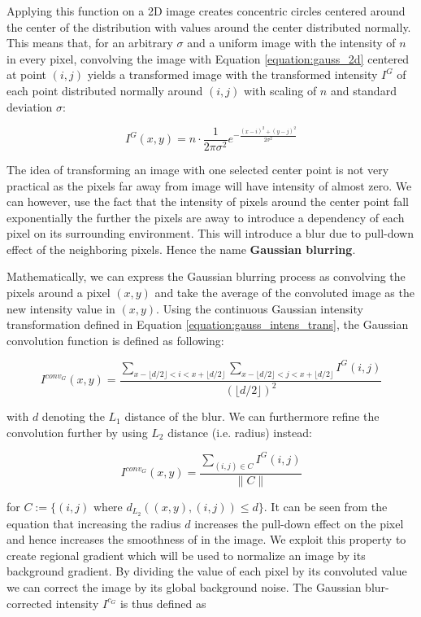 \documentclass[pdftex,12pt,a4paper]{report}
\begin{document}
Applying this function on a 2D image creates concentric circles centered around the center of the distribution with values around the center distributed normally. This means that, for an arbitrary $\sigma$  and a uniform image with the intensity of $n$ in every pixel,  convolving the image with Equation \ref{equation:gauss_2d} centered at point $(i, j)$ yields a transformed image with the transformed intensity $I^G$ of each point distributed normally around $(i, j)$ with scaling of $n$ and standard deviation $\sigma$:

\begin{equation}
I^G(x, y) = n \cdot \frac{1}{{2\pi \sigma^2}} e^{-\frac{(x - i)^2 + (y - j)^2}{2 \sigma^2}}
\label{equation:gauss_intens_trans}
\end{equation}

The idea of transforming an image with one selected center point is not very practical as the pixels far away from image will have intensity of almost zero. We can however, use the fact that the intensity of pixels around the center point fall exponentially the further the pixels are away to introduce a dependency of each pixel on its surrounding environment. This will introduce a blur due to pull-down effect of the neighboring pixels. Hence the name \textbf{Gaussian blurring}.

Mathematically, we can express the Gaussian blurring process as convolving the pixels around a pixel $(x, y)$ and take the average of the convoluted image as the new intensity value in $(x, y)$. Using the continuous Gaussian intensity transformation defined in Equation \ref{equation:gauss_intens_trans}, the Gaussian convolution  function is defined as following:

$$
I^{conv_G}(x, y) = \frac{\sum_{x - \lfloor d/2 \rfloor < i < x + \lfloor d/2 \rfloor} \sum_{x - \lfloor d/2 \rfloor < j < x + \lfloor d/2 \rfloor} I^G(i, j)}{(\lfloor d/2 \rfloor)^2}
$$

with $d$ denoting the $L_1$ distance of the blur.  We can furthermore refine the convolution further by using $L_2$ distance (i.e. radius) instead:

\begin{equation}
I^{conv_G}(x, y) = \frac{\sum_{(i, j) \in C}  I^G(i, j)}{\| C \|}
\label{equation:conv_gaussian_cont}
\end{equation}

for $C := \{(i, j)  \text{  where } d_{L_2}((x, y), (i, j)) \leq d\}$. It can be seen from the equation that increasing the radius $d$ increases the pull-down effect on the pixel and hence increases the smoothness of in the image. We exploit this property to create regional gradient which will be used to normalize an image by its background gradient. By dividing the value of each pixel by its convoluted value we can correct the image by its global background noise. The Gaussian blur-corrected intensity $I^{c_G}$ is thus defined as
\end{document}
